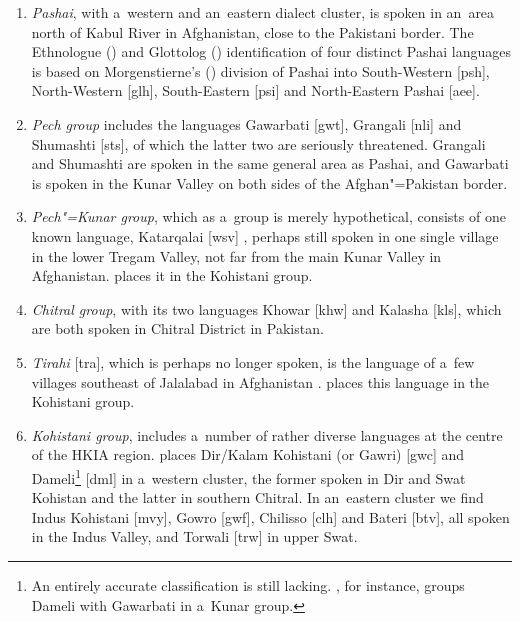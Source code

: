 \begin{enumerate}
\item \textit{Pashai}, with a~western and an~eastern dialect cluster, is spoken in an~area north of Kabul River in Afghanistan, close to the Pakistani border. The Ethnologue (\citeyear{ethnologue2015}) and Glottolog (\citeyear{glottolog2015}) identification of four distinct Pashai languages is based on Morgenstierne's (\citeyear{morgenstierne_pashai1973}) division of Pashai into South-Western [psh], North-Western [glh], South-Eastern [psi] and North-Eastern Pashai [aee].


\item \textit{Pech group} includes the languages Gawarbati [gwt], Grangali [nli] and Shumashti [sts], of which the latter two are seriously threatened. Grangali and Shumashti are spoken in the same general area as Pashai, and Gawarbati is spoken in the Kunar Valley on both sides of the Afghan"=Pakistan border. 


\item \textit{Pech"=Kunar group}, which as a~group is merely hypothetical, consists of one known language, Katarqalai [wsv] \citep{buddruss1960}, perhaps still spoken in one single village in the lower Tregam Valley, not far from the main Kunar Valley in Afghanistan. \citet[825]{bashir2003} places it in the Kohistani group.


\item \textit{Chitral group}, with its two languages Khowar [khw] and Kalasha [kls], which are both spoken in Chitral District in Pakistan.


\item \textit{Tirahi} [tra], which is perhaps no longer spoken, is the language of a~few villages southeast of Jalalabad in Afghanistan \citep{morgenstierne_tirahi1934}. \citet[824]{bashir2003} places this language in the Kohistani group.


\item \textit{Kohistani group}, includes a~number of rather diverse languages at the centre of the HKIA region. \citet[258]{strand2001} places Dir/Kalam Kohistani (or Gawri) [gwc] and Dameli\footnote{An entirely accurate classification is still lacking. \citet[824]{bashir2003}, for instance, groups Dameli with Gawarbati in a~Kunar group.} [dml] in a~western cluster, the former spoken in Dir and Swat Kohistan and the latter in southern Chitral. In an~eastern cluster we find Indus Kohistani [mvy], Gowro [gwf], Chilisso [clh] and Bateri [btv], all spoken in the Indus Valley, and Torwali [trw] in upper Swat.



\end{enumerate}
